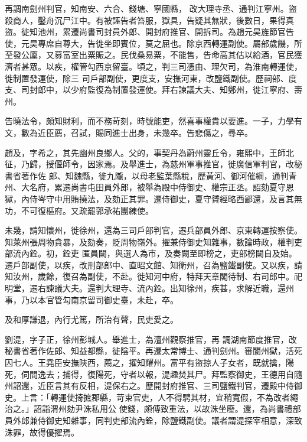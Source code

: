 \begin{pinyinscope}
 再調南劍州判官，知南安、六合、錢塘、寧國縣，
 改大理寺丞、通判江寧州。盜殺商人，鑿舟沉尸江中。有被誣告者笞服，獄具，告疑其無狀，後數日，果得真盜。徙知池州，累遷尚書司封員外郎、開封府推官、開拆司。為趙元昊旌節官告使，元昊專席自尊大，告徙坐即賓位，莫之屈也。除京西轉運副使。屬部歲饑，所至發公廩，又募富室出粟賑之。民伐桑易粟，不能售，告命高其估以給酒，官民獲濟者甚眾。以疾，權管勾西京留臺。頃之，判三司憑由、理欠司，為淮南轉運使，徙制置發運使，除三
 司戶部副使，更度支，安撫河東，改鹽鐵副使。歷祠部、度支、司封郎中，以少府監復為制置發運使。拜右諫議大夫、知鄭州，徙江寧府、壽州。



 告曉法令，頗知財利，而不務苛刻，時號能吏，然喜事權貴以要進。一子，力學有文，數為近臣薦，召試，賜同進士出身，未幾卒。告悲傷之，尋卒。



 趙及，字希之，其先幽州良鄉人。父的，事契丹為蔚州靈丘令，雍熙中，王師北征，乃歸，授偃師令，因家焉。及舉進士，為慈州軍事推官，徙廣信軍判官，改秘書省著作佐
 郎、知魏縣，徙九隴，以母老監葉縣稅，歷黃河、御河催綱，通判青州、大名府，累遷尚書屯田員外郎，被舉為殿中侍御史、權宗正丞。詔劾夏守恩獄，內侍岑守中用賄撓法，及劾正其罪。遷侍御史，夏守贇經略西鄙還，及言其無功，不可復樞府。又疏罷郭承祐團練使。



 未幾，請知懷州，徙徐州，還為三司戶部判官，遷兵部員外郎、京東轉運按察使。知萊州張周物貪暴，及劾奏，貶周物嶺外。擢兼侍御史知雜事，數論時政，權判吏部流內銓。初，銓吏
 匿員闕，與選人為市，及奏闕至即榜之，吏部榜闕自及始。遷戶部副使，以疾，改刑部郎中、直昭文館、知衛州，召為鹽鐵副使。又以疾，請知汝州，歲餘，復召為副使，不赴。徙知河中府，特拜天章閣待制、右司郎中。祀明堂，遷右諫議大夫。還判大理寺、流內銓。出知徐州，疾甚，求解近職，還州事，乃以本官管勾南京留司御史臺，未赴，卒。



 及和厚謙退，內行尤篤，所治有聲，民吏愛之。



 劉湜，字子正，徐州彭城人。舉進士，為澶州觀察推官，再
 調湖南節度推官，改秘書省著作佐郎、知益都縣，徙陰平。再遷太常博士、通判劍州。審閬州獄，活死囚七人。王堯臣安撫陜西，薦之，擢知耀州。富平有盜掠人子女者，既就擒，陽死，伺間逸去；捕得，復陽死，守者以報，湜趣焚其尸。拜監察御史，王德用自隨州詔還，近臣言其有反相，湜保右之。歷開封府推官、三司鹽鐵判官，遷殿中侍御史。上言：「轉運使掎摭郡縣，苛束官吏，人不得騁其材，宜稍寬假，不為改者繩治之。」詔詣渭州劾尹洙私用公
 使錢，頗傅致重法，以故洙坐廢。還，為尚書禮部員外郎兼侍御史知雜事，同判吏部流內銓，除鹽鐵副使。議者謂湜探宰相意，深致洙罪，故得優擢焉。




\end{pinyinscope}

